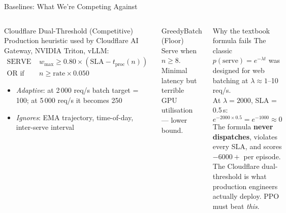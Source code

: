 \documentclass[aspectratio=169]{beamer}
\begin{document}
\begin{frame}{Baselines: What We're Competing Against}
  \begin{columns}[T]
      \begin{block}{\textcolor{cfOrange}{Cloudflare Dual-Threshold (Competitive)}}
        Production heuristic used by Cloudflare AI Gateway, NVIDIA Triton, vLLM:
        \begin{align*}
          \text{SERVE if } & w_{\max} \geq 0.80 \times (\text{SLA} - t_\text{proc}(n))\\
          \text{OR if }    & n \geq \text{rate} \times 0.050
        \end{align*}
        \begin{itemize}
          \item \textit{Adaptive}: at 2\,000 req/s batch target = 100;
                at 5\,000 req/s it becomes 250
          \item \textit{Ignores}: EMA trajectory, time-of-day, inter-serve interval
        \end{itemize}
      \end{block}
      \vspace{4pt}
      \begin{block}{\textcolor{greedyGreen}{GreedyBatch (Floor)}}
        Serve when $n \geq 8$.
        Minimal latency but terrible GPU utilisation — lower bound.
      \end{block}

      \begin{alertblock}{Why the textbook formula fails}
        The classic $p(\text{serve}) = e^{-\lambda t}$ was designed for
        web batching at $\lambda \approx 1$--10 req/s.\\[6pt]
        At $\lambda = 2000$, SLA = 0.5\,s:
        \begin{equation*}
          e^{-2000 \times 0.5} = e^{-1000} \approx 0
        \end{equation*}
        The formula \textbf{never dispatches}, violates every SLA,
        and scores $-6000+$ per episode.\\[6pt]
        The Cloudflare dual-threshold is what production engineers
        actually deploy.  PPO must beat \emph{this}.
      \end{alertblock}
  \end{columns}
\end{frame}
\end{document}
